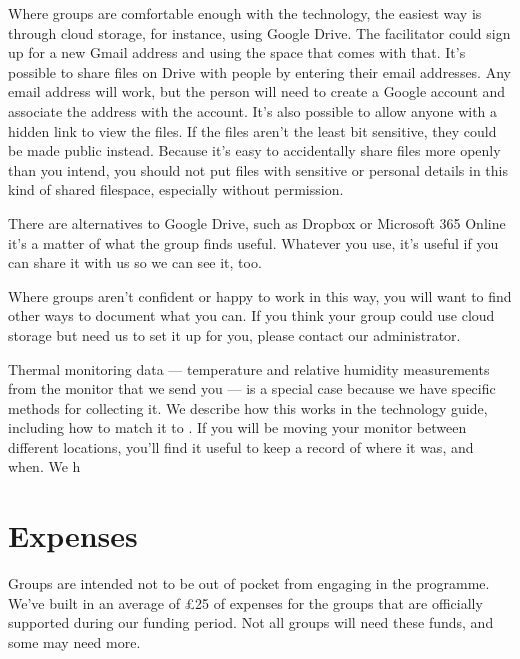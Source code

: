 \documentclass[letterpaper,10pt,english]{jupyterBook}
\begin{document}
\sphinxAtStartPar
Where groups are comfortable enough with the technology, the easiest way is through cloud storage, for instance, using Google Drive.  The facilitator could sign up for a new Gmail address and using the space that comes with that.  It’s possible to share files on Drive with people by entering their email addresses.  Any email address will work, but the person will need to create a Google account and associate the address with the account.   It’s also possible to allow anyone with a hidden link to view the files.  If the files aren’t the least bit sensitive, they could be made public instead.  Because it’s easy to accidentally share files more openly than you intend, you should not put files with sensitive or personal details in this kind of shared filespace, especially without permission.

\sphinxAtStartPar
There are alternatives to Google Drive, such as Dropbox or Microsoft 365 Online \sphinxhyphen{} it’s a matter of what the group finds useful.  Whatever you use, it’s useful if you can share it with us so we can see it, too.

\sphinxAtStartPar
Where groups aren’t confident or happy to work in this way, you will want to find other ways to document what you can. If you think your group could use cloud storage but need us to set it up for you, please contact our administrator.

\sphinxAtStartPar
Thermal monitoring data — temperature and relative humidity measurements from the monitor that we send you — is a special case because we have specific methods for collecting it.  We describe how this works in the technology guide, including how to match it to .  If you will be moving your monitor between different locations, you’ll find it useful to keep a record of where it was, and when.  We h

\sphinxstepscope


\chapter{Expenses}
\label{\detokenize{expenses:expenses}}\label{\detokenize{expenses::doc}}
\sphinxAtStartPar
Groups are intended not to be out of pocket from engaging in the programme.  We’ve built in an average of £25 of expenses for the groups that are officially supported during our funding period.  Not all groups will need these funds, and some may need more.
\end{document}
